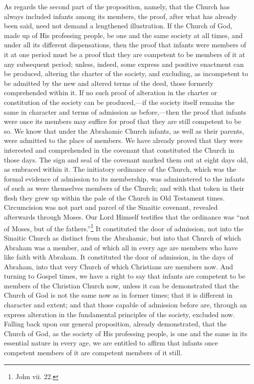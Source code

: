 \documentclass[english,]{book}
\begin{document}
As regards the second part of the proposition, namely, that the Church has always included infants among its members, the proof, after what has already been said, need not demand a lengthened illustration. If the Church of God, made up of His professing people, be one and the same society at all times, and under all its different dispensations, then the proof that infants were members of it at one period must be a proof that they are competent to be members of it at any subsequent period; unless, indeed, some express and positive enactment can be produced, altering the charter of the society, and excluding, as incompetent to be admitted by the new and altered terms of the deed, those formerly comprehended within it. If no such proof of alteration in the charter or constitution of the society can be produced,---if the society itself remains the same in character and terms of admission as before,---then the proof that infants were once its members may suffice for proof that they are still competent to be so. We know that under the Abrahamic Church infants, as well as their parents, were admitted to the place of members. We have already proved that they were interested and comprehended in the covenant that constituted the Church in those days. The sign and seal of the covenant marked them out at eight days old, as embraced within it. The initiatory ordinance of the Church, which was the formal evidence of admission to its membership, was administered to the infants of such as were themselves members of the Church; and with that token in their flesh they grew up within the pale of the Church in Old Testament times. Circumcision was not part and parcel of the Sinaitic covenant, revealed afterwards through Moses. Our Lord Himself testifies that the ordinance was ``not of Moses, but of the fathers.''\footnote{John vii. 22.} It constituted the door of admission, not into the Sinaitic Church as distinct from the Abrahamic, but into that Church of which Abraham was a member, and of which all in every age are members who have like faith with Abraham. It constituted the door of admission, in the days of Abraham, into that very Church of which Christians are members now. And turning to Gospel times, we have a right to say that infants are competent to be members of the Christian Church now, unless it can be demonstrated that the Church of God is not the same now as in former times; that it is different in character and extent; and that those capable of admission before are, through an express alteration in the fundamental principles of the society, excluded now. Falling back upon our general proposition, already demonstrated, that the Church of God, as the society of His professing people, is one and the same in its essential nature in every age, we are entitled to affirm that infants once competent members of it are competent members of it still.
\end{document}
